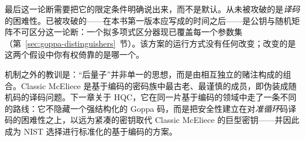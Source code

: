 最后这一论断需要把它的限定条件明确说出来，而不是默认。从未被攻破的是\emph{译码}的困难性。已被攻破的——在本书第一版本应写成的时间之后——是公钥与随机矩阵不可区分这一论断：一个拟多项式区分器现已覆盖每一个参数集（第~\ref{sec:goppa-distinguishers}~节）。该方案的运行方式没有任何改变；改变的是这两个假设中你有权倚靠的是哪一个。

机制之外的教训是：“后量子”并非单一的思想，而是由相互独立的赌注构成的组合。Classic McEliece 是基于编码的密码族中最古老、最谨慎的成员，即伪装成随机码的译码问题。下一章关于 HQC，它在同一片基于编码的领域中走了一条不同的路线：它不隐藏一个强结构化的 Goppa 码，而是把安全性建立在对\emph{准循环}码译码的困难性之上，以远为紧凑的密钥取代 Classic McEliece 的巨型密钥——并因此成为 NIST 选择进行标准化的基于编码的方案。

\printbibliography[heading=chapterrefs]
